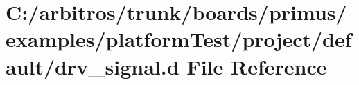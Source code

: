 \hypertarget{platform_test_2project_2default_2drv__signal_8d}{\section{C\-:/arbitros/trunk/boards/primus/examples/platform\-Test/project/default/drv\-\_\-signal.d File Reference}
\label{platform_test_2project_2default_2drv__signal_8d}
}
